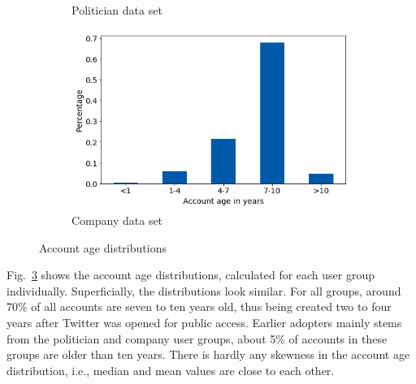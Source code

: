 \begin{figure}[h]
\begin{subfigure}{.33\textwidth}
  \caption{Politician data set}
  \label{fig:age_distr_sub2}
\end{subfigure}
\begin{subfigure}{.33\textwidth}
  \centering
  \includegraphics[width=.95\linewidth]{img/corp_age_distr}
  \caption{Company data set}
  \label{fig:age_distr_sub3}
\end{subfigure}%
\caption{Account age distributions}
\label{fig:age_distr}
\end{figure}

Fig.~\ref{fig:age_distr} shows the account age distributions, calculated for
each user group individually.
Superficially, the distributions look similar.
For all groups, around 70\% of all accounts are seven to ten years old, thus being
created two to four years after Twitter was opened for public access.
Earlier adopters mainly stems from the politician and company user groups, about
5\% of accounts in these groups are older than ten years.
There is hardly any skewness in the account age distribution, i.e., median and
mean values are close to each other.


